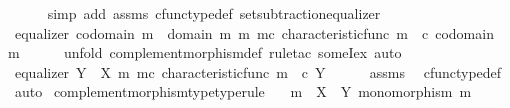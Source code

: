 \begin{isabellebody}
\ \ \ \ \isamarkupfalse%
\ {\isacharparenleft}{\kern0pt}simp\ add{\isacharcolon}{\kern0pt}\ assms\ cfunc{\isacharunderscore}{\kern0pt}type{\isacharunderscore}{\kern0pt}def\ set{\isacharunderscore}{\kern0pt}subtraction{\isacharunderscore}{\kern0pt}equalizer{\isacharparenright}{\kern0pt}\isanewline
\ \ \isamarkupfalse%
\ \isamarkupfalse%
\ {\isachardoublequoteopen}equalizer\ {\isacharparenleft}{\kern0pt}codomain\ m\ {\isasymsetminus}\ {\isacharparenleft}{\kern0pt}domain\ m{\isacharcomma}{\kern0pt}\ m{\isacharparenright}{\kern0pt}{\isacharparenright}{\kern0pt}\ m\isactrlsup c\ {\isacharparenleft}{\kern0pt}characteristic{\isacharunderscore}{\kern0pt}func\ m{\isacharparenright}{\kern0pt}\ {\isacharparenleft}{\kern0pt}{\isasymf}\ {\isasymcirc}\isactrlsub c\ {\isasymbeta}\isactrlbsub codomain\ m\isactrlesub {\isacharparenright}{\kern0pt}{\isachardoublequoteclose}\isanewline
\ \ \ \ \isamarkupfalse%
\ {\isacharparenleft}{\kern0pt}unfold\ complement{\isacharunderscore}{\kern0pt}morphism{\isacharunderscore}{\kern0pt}def{\isacharcomma}{\kern0pt}\ rule{\isacharunderscore}{\kern0pt}tac\ someI{\isacharunderscore}{\kern0pt}ex{\isacharcomma}{\kern0pt}\ auto{\isacharparenright}{\kern0pt}\isanewline
\ \ \isamarkupfalse%
\ \isamarkupfalse%
\ {\isachardoublequoteopen}equalizer\ {\isacharparenleft}{\kern0pt}Y\ {\isasymsetminus}\ {\isacharparenleft}{\kern0pt}X{\isacharcomma}{\kern0pt}\ m{\isacharparenright}{\kern0pt}{\isacharparenright}{\kern0pt}\ m\isactrlsup c\ {\isacharparenleft}{\kern0pt}characteristic{\isacharunderscore}{\kern0pt}func\ m{\isacharparenright}{\kern0pt}\ {\isacharparenleft}{\kern0pt}{\isasymf}\ {\isasymcirc}\isactrlsub c\ {\isasymbeta}\isactrlbsub Y\isactrlesub {\isacharparenright}{\kern0pt}{\isachardoublequoteclose}\isanewline
\ \ \ \ \isamarkupfalse%
\ assms\ \isamarkupfalse%
\ cfunc{\isacharunderscore}{\kern0pt}type{\isacharunderscore}{\kern0pt}def\ \isamarkupfalse%
\ auto\isanewline
{}\isamarkupfalse%
%
\endisatagproof
{\isafoldproof}%
%
\isadelimproof
\isanewline
%
\endisadelimproof
\isanewline
{}\isamarkupfalse%
\ complement{\isacharunderscore}{\kern0pt}morphism{\isacharunderscore}{\kern0pt}type{\isacharbrackleft}{\kern0pt}type{\isacharunderscore}{\kern0pt}rule{\isacharbrackright}{\kern0pt}{\isacharcolon}{\kern0pt}\isanewline
\ \ \ {\isachardoublequoteopen}m\ {\isacharcolon}{\kern0pt}\ X\ {\isasymrightarrow}\ Y{\isachardoublequoteclose}\ {\isachardoublequoteopen}monomorphism\ m{\isachardoublequoteclose}\isanewline

\end{isabellebody}
